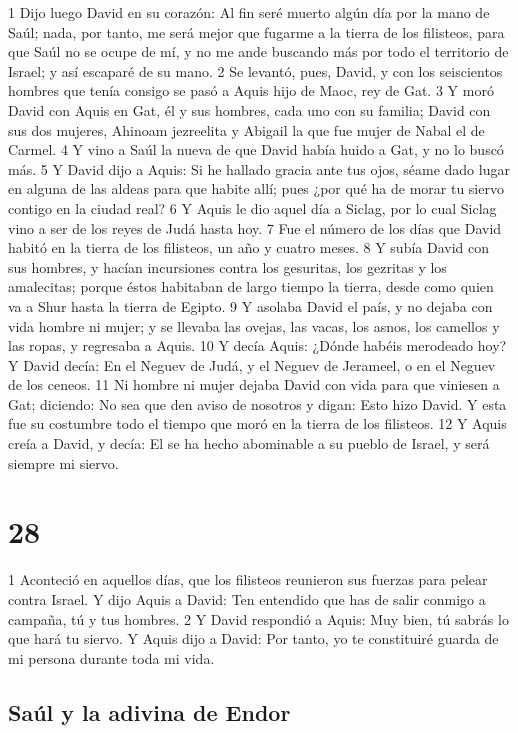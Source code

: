 1 Dijo luego David en su corazón: Al fin seré muerto algún día por la mano de Saúl; nada, por tanto, me será mejor que fugarme a la tierra de los filisteos, para que Saúl no se ocupe de mí, y no me ande buscando más por todo el territorio de Israel; y así escaparé de su mano.
2 Se levantó, pues, David, y con los seiscientos hombres que tenía consigo se pasó a Aquis hijo de Maoc, rey de Gat.
3 Y moró David con Aquis en Gat, él y sus hombres, cada uno con su familia; David con sus dos mujeres, Ahinoam jezreelita y Abigail la que fue mujer de Nabal el de Carmel.
4 Y vino a Saúl la nueva de que David había huido a Gat, y no lo buscó más.
5 Y David dijo a Aquis: Si he hallado gracia ante tus ojos, séame dado lugar en alguna de las aldeas para que habite allí; pues ¿por qué ha de morar tu siervo contigo en la ciudad real?
6 Y Aquis le dio aquel día a Siclag, por lo cual Siclag vino a ser de los reyes de Judá hasta hoy.
7 Fue el número de los días que David habitó en la tierra de los filisteos, un año y cuatro meses.
8 Y subía David con sus hombres, y hacían incursiones contra los gesuritas, los gezritas y los amalecitas; porque éstos habitaban de largo tiempo la tierra, desde como quien va a Shur hasta la tierra de Egipto.
9 Y asolaba David el país, y no dejaba con vida hombre ni mujer; y se llevaba las ovejas, las vacas, los asnos, los camellos y las ropas, y regresaba a Aquis.
10 Y decía Aquis: ¿Dónde habéis merodeado hoy? Y David decía: En el Neguev de Judá, y el Neguev de Jerameel, o en el Neguev de los ceneos.
11 Ni hombre ni mujer dejaba David con vida para que viniesen a Gat; diciendo: No sea que den aviso de nosotros y digan: Esto hizo David. Y esta fue su costumbre todo el tiempo que moró en la tierra de los filisteos.
12 Y Aquis creía a David, y decía: El se ha hecho abominable a su pueblo de Israel, y será siempre mi siervo.

\chapter{28}


1 Aconteció en aquellos días, que los filisteos reunieron sus fuerzas para pelear contra Israel. Y dijo Aquis a David: Ten entendido que has de salir conmigo a campaña, tú y tus hombres.
2 Y David respondió a Aquis: Muy bien, tú sabrás lo que hará tu siervo. Y Aquis dijo a David: Por tanto, yo te constituiré guarda de mi persona durante toda mi vida.
\section*{Saúl y la adivina de Endor}

